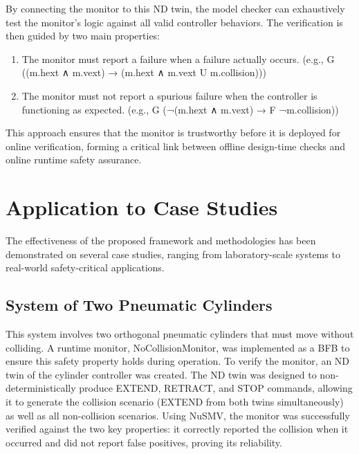 By connecting the monitor to this ND twin, the model checker can exhaustively test the monitor's logic against all valid controller behaviors. The verification is then guided by two main properties:

\begin{enumerate}
\item The monitor must report a failure when a failure actually occurs. (e.g., G ((m.hext ∧ m.vext) → (m.hext ∧ m.vext U m.collision)))
\item The monitor must not report a spurious failure when the controller is functioning as expected. (e.g., G (¬(m.hext ∧ m.vext) → F ¬m.collision))
\end{enumerate}

This approach ensures that the monitor is trustworthy before it is deployed for online verification, forming a critical link between offline design-time checks and online runtime safety assurance.

\section{Application to Case Studies}\label{sec:case_studies}

The effectiveness of the proposed framework and methodologies has been demonstrated on several case studies, ranging from laboratory-scale systems to real-world safety-critical applications.

\subsection{System of Two Pneumatic Cylinders}

This system involves two orthogonal pneumatic cylinders that must move without colliding. A runtime monitor, NoCollisionMonitor, was implemented as a BFB to ensure this safety property holds during operation. To verify the monitor, an ND twin of the cylinder controller was created. The ND twin was designed to non-deterministically produce EXTEND, RETRACT, and STOP commands, allowing it to generate the collision scenario (EXTEND from both twins simultaneously) as well as all non-collision scenarios. Using NuSMV, the monitor was successfully verified against the two key properties: it correctly reported the collision when it occurred and did not report false positives, proving its reliability.

